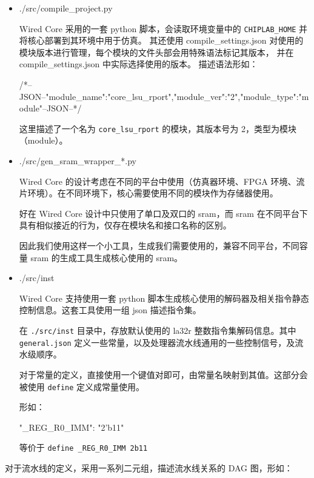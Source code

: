 \begin{itemize}
\item
  ./src/compile\_project.py

  Wired Core 采用的一套 python 脚本，会读取环境变量中的 \texttt{CHIPLAB\_HOME} 并将核心部署到其环境中用于仿真。 其还使用 compile\_settings.json 对使用的模块版本进行管理，每个模块的文件头部会用特殊语法标记其版本， 并在 compile\_settings.json 中实际选择使用的版本。 描述语法形如：

\begin{CodeBlock}[language=BookSystemVerilog]
/*--JSON--{"module_name":"core_lsu_rport","module_ver":"2","module_type":"module"}--JSON--*/
\end{CodeBlock}

  这里描述了一个名为 \texttt{core\_lsu\_rport} 的模块，其版本号为 2，类型为模块（module）。
\item
  ./src/gen\_sram\_wrapper\_*.py

  Wired Core 的设计考虑在不同的平台中使用（仿真器环境、FPGA 环境、流片环境）。在不同环境下，核心需要使用不同的模块作为存储器使用。

  好在 Wired Core 设计中只使用了单口及双口的 sram，而 sram 在不同平台下具有相似接近的行为，仅存在模块名和接口名称的区别。

  因此我们使用这样一个小工具，生成我们需要使用的，兼容不同平台，不同容量 sram 的生成工具生成核心使用的 sram。
\item
  ./src/inst

  Wired Core 支持使用一套 python 脚本生成核心使用的解码器及相关指令静态控制信息。这套工具使用一组 json 描述指令集。

  在 \texttt{./src/inst} 目录中，存放默认使用的 la32r 整数指令集解码信息。其中 \texttt{general.json} 定义一些常量，以及处理器流水线通用的一些控制信号，及流水级顺序。

  对于常量的定义，直接使用一个键值对即可，由常量名映射到其值。这部分会被使用 \texttt{\textasciigrave{}define} 定义成常量使用。

  形如：

\begin{CodeBlock}[language=BookJSON]
"_REG_R0_IMM": "2'b11"
\end{CodeBlock}

  等价于 \texttt{\textasciigrave{}define\ \_REG\_R0\_IMM\ 2\textquotesingle{}b11}
\end{itemize}

对于流水线的定义，采用一系列二元组，描述流水线关系的 DAG 图，形如：

